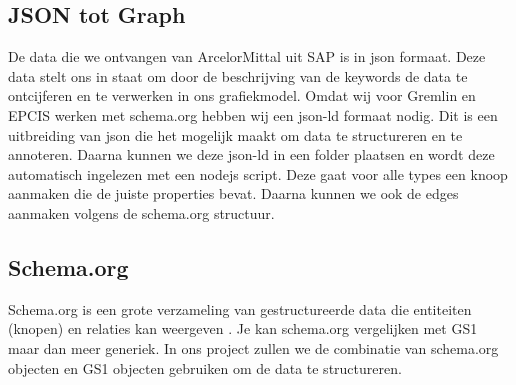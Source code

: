 \subsection{JSON tot Graph}
De data die we ontvangen van ArcelorMittal uit SAP is in json formaat. Deze data stelt ons in staat om door de beschrijving van de keywords de data te ontcijferen en te verwerken in ons grafiekmodel.
Omdat wij voor Gremlin en EPCIS werken met schema.org hebben wij een json-ld formaat nodig. Dit is een uitbreiding van json die het mogelijk maakt om data te structureren en te annoteren.
Daarna kunnen we deze json-ld in een folder plaatsen en wordt deze automatisch ingelezen met een nodejs script.
Deze gaat voor alle types een knoop aanmaken die de juiste properties bevat. Daarna kunnen we ook de edges aanmaken volgens de schema.org structuur.

\subsection{Schema.org}
Schema.org is een grote verzameling van gestructureerde data die entiteiten (knopen) en relaties kan weergeven \autocite{Douglas2023}.
Je kan schema.org vergelijken met GS1 maar dan meer generiek. In ons project zullen we de combinatie van schema.org objecten en GS1 objecten gebruiken om de data te structureren.





